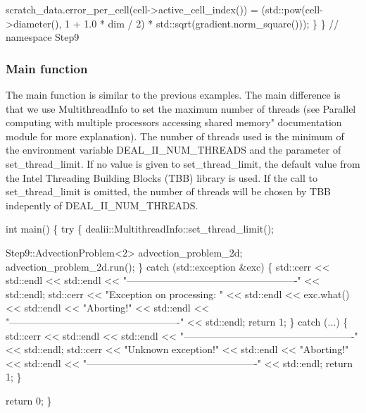 \begin{DoxyCode}
    scratch\_data.error\_per\_cell(cell->active\_cell\_index()) =
        (std::pow(cell->diameter(), 1 + 1.0 * dim / 2) *
         std::sqrt(gradient.norm\_square()));
\}
\}  \textcolor{comment}{// namespace Step9}
\end{DoxyCode}


\label{_Mainfunction}%
 \subsubsection*{Main function}

The {\ttfamily main} function is similar to the previous examples. The main difference is that we use Multithread\+Info to set the maximum number of threads (see Parallel computing with multiple processors accessing shared memory" documentation module for more explanation). The number of threads used is the minimum of the environment variable D\+E\+A\+L\+\_\+\+I\+I\+\_\+\+N\+U\+M\+\_\+\+T\+H\+R\+E\+A\+DS and the parameter of {\ttfamily set\+\_\+thread\+\_\+limit}. If no value is given to {\ttfamily set\+\_\+thread\+\_\+limit}, the default value from the Intel Threading Building Blocks (T\+BB) library is used. If the call to {\ttfamily set\+\_\+thread\+\_\+limit} is omitted, the number of threads will be chosen by T\+BB indepently of D\+E\+A\+L\+\_\+\+I\+I\+\_\+\+N\+U\+M\+\_\+\+T\+H\+R\+E\+A\+DS.


\begin{DoxyCode}
\textcolor{keywordtype}{int} main()
\{
    \textcolor{keywordflow}{try} \{
        dealii::MultithreadInfo::set\_thread\_limit();

        Step9::AdvectionProblem<2> advection\_problem\_2d;
        advection\_problem\_2d.run();
    \} \textcolor{keywordflow}{catch} (std::exception &exc) \{
        std::cerr << std::endl
                  << std::endl
                  << \textcolor{stringliteral}{"----------------------------------------------------"}
                  << std::endl;
        std::cerr << \textcolor{stringliteral}{"Exception on processing: "} << std::endl
                  << exc.what() << std::endl
                  << \textcolor{stringliteral}{"Aborting!"} << std::endl
                  << \textcolor{stringliteral}{"----------------------------------------------------"}
                  << std::endl;
        \textcolor{keywordflow}{return} 1;
    \} \textcolor{keywordflow}{catch} (...) \{
        std::cerr << std::endl
                  << std::endl
                  << \textcolor{stringliteral}{"----------------------------------------------------"}
                  << std::endl;
        std::cerr << \textcolor{stringliteral}{"Unknown exception!"} << std::endl
                  << \textcolor{stringliteral}{"Aborting!"} << std::endl
                  << \textcolor{stringliteral}{"----------------------------------------------------"}
                  << std::endl;
        \textcolor{keywordflow}{return} 1;
    \}

    \textcolor{keywordflow}{return} 0;
\}
\end{DoxyCode}
 \label{_Results}%
